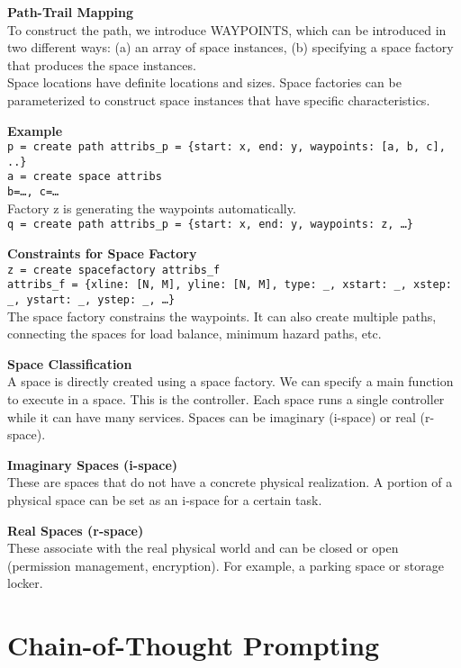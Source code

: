 \documentclass[10pt,a4paper]{article}
\begin{document}
\begin{multicols}{2}
    \textbf{Path-Trail Mapping}\\
    To construct the path, we introduce WAYPOINTS, which can be introduced in two different ways: (a) an array of space instances, (b) specifying a space factory that produces the space instances.\\
    Space locations have definite locations and sizes. Space factories can be parameterized to construct space instances that have specific characteristics.

    \textbf{Example}\\
    \texttt{p = create path attribs\_p = \{start: x, end: y, waypoints: [a, b, c], ..\}}\\
    \texttt{a = create space attribs}\\
    \texttt{b=…, c=…}\\
    Factory z is generating the waypoints automatically.\\
    \texttt{q = create path attribs\_p = \{start: x, end: y, waypoints: z, …\}}

    \textbf{Constraints for Space Factory}\\
    \texttt{z = create spacefactory attribs\_f}\\
    \texttt{attribs\_f = \{xline: [N, M], yline: [N, M], type: \_, xstart: \_, xstep: \_, ystart: \_, ystep: \_, …\}}\\
    The space factory constrains the waypoints. It can also create multiple paths, connecting the spaces for load balance, minimum hazard paths, etc.

    \textbf{Space Classification}\\
    A space is directly created using a space factory. We can specify a main function to execute in a space. This is the controller. Each space runs a single controller while it can have many services. Spaces can be imaginary (i-space) or real (r-space).

    \textbf{Imaginary Spaces (i-space)}\\
    These are spaces that do not have a concrete physical realization. A portion of a physical space can be set as an i-space for a certain task.

    \textbf{Real Spaces (r-space)}\\
    These associate with the real physical world and can be closed or open (permission management, encryption). For example, a parking space or storage locker.


    \section*{Chain-of-Thought Prompting}


\end{multicols}
\end{document}
